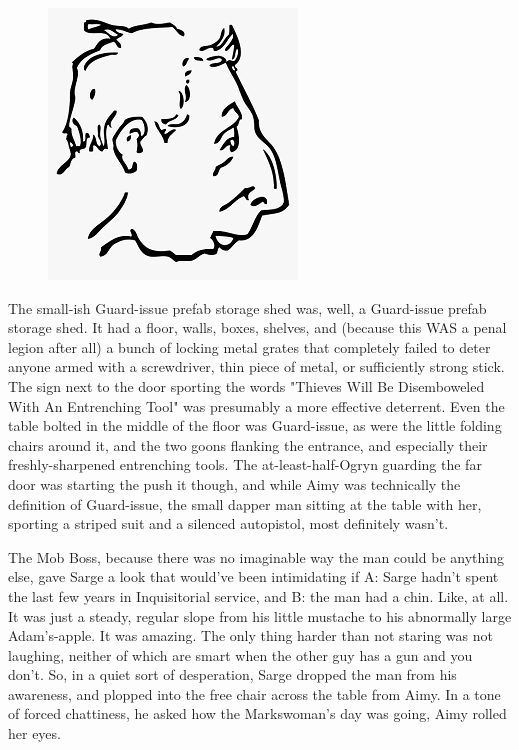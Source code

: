 \begin{figure}
	\begin{center}
		\includegraphics[width=\figwidth]{pics/21/43.png}
	\end{center}
\end{figure}
The small-ish Guard-issue prefab storage shed was, well, a Guard-issue prefab storage shed. 
It had a floor, walls, boxes, shelves, and (because this WAS a penal legion after all) a bunch of locking metal grates that completely failed to deter anyone armed with a screwdriver, thin piece of metal, or sufficiently strong stick. 
The sign next to the door sporting the words "Thieves Will Be Disemboweled With An Entrenching Tool" was presumably a more effective deterrent. 
Even the table bolted in the middle of the floor was Guard-issue, as were the little folding chairs around it, and the two goons flanking the entrance, and especially their freshly-sharpened entrenching tools. 
The at-least-half-Ogryn guarding the far door was starting the push it though, and while Aimy was technically the definition of Guard-issue, the small dapper man sitting at the table with her, sporting a striped suit and a silenced autopistol, most definitely wasn't.

The Mob Boss, because there was no imaginable way the man could be anything else, gave Sarge a look that would've been intimidating if A: 
Sarge hadn't spent the last few years in Inquisitorial service, and B: 
the man had a chin. 
Like, at all. 
It was just a steady, regular slope from his little mustache to his abnormally large Adam's-apple. 
It was amazing. 
The only thing harder than not staring was not laughing, neither of which are smart when the other guy has a gun and you don't. 
So, in a quiet sort of desperation, Sarge dropped the man from his awareness, and plopped into the free chair across the table from Aimy. 
In a tone of forced chattiness, he asked how the Markswoman's day was going, Aimy rolled her eyes.

